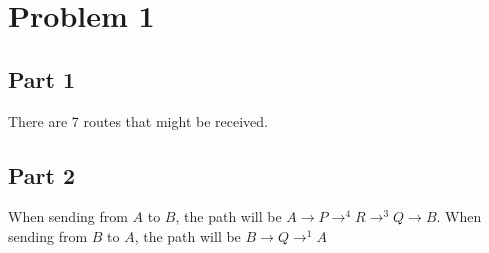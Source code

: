 \documentclass{article}%
\begin{document}
\section*{Problem 1}

\subsection*{Part 1}
There are 7 routes that might be received.

\subsection*{Part 2}
When sending from $A$ to $B$, the path will be $A \rightarrow P \rightarrow^{4} R \rightarrow^{3} Q \rightarrow B$. When
sending from $B$ to $A$, the path will be $B \rightarrow Q \rightarrow^{1} A$
\end{document}
